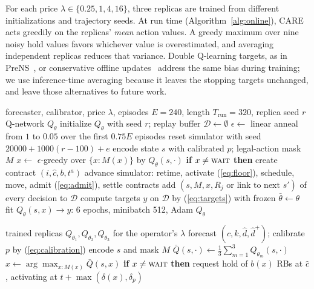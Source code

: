 \documentclass[conference]{IEEEtran}
\begin{document}
For each price $\lambda\in\{0.25,1,4,16\}$, three replicas are trained from different initializations and trajectory seeds. At run time (Algorithm~\ref{alg:online}), CARE acts greedily on the replicas' \emph{mean} action values. A greedy maximum over nine noisy hold values favors whichever value is overestimated, and averaging independent replicas reduces that variance. Double Q-learning targets, as in PreNS~\cite{wu2026prens}, or conservative offline updates~\cite{eldeeb2025offline} address the same bias during training; we use inference-time averaging because it leaves the stopping targets unchanged, and leave those alternatives to future work.

\begin{algorithm}[t]
\caption{CARE training at price $\lambda$ (one replica)}
\label{alg:train}
\begin{algorithmic}[1]
\REQUIRE forecaster, calibrator, price $\lambda$, episodes $E=240$, length $T_{\mathrm{run}}=320$, replica seed $r$
\ENSURE Q-network $Q_\theta$
\STATE initialize $Q_\theta$ with seed $r$; replay buffer $\mathcal{D}\leftarrow\emptyset$
  \STATE $\epsilon\leftarrow$ linear anneal from $1$ to $0.05$ over the first $0.75E$ episodes
  \STATE reset simulator with seed $20000+1000(r-100)+e$
      \STATE encode state $s$ with calibrated $p$; legal-action mask $M$
      \STATE $x\leftarrow$ $\epsilon$-greedy over $\{x:M(x)\}$ by $Q_\theta(s,\cdot)$
      \STATE \textbf{if} $x\ne\textsc{wait}$ \textbf{then} create contract $(i,\hat{c},b,t^{a})$
    \ENDFOR
    \STATE advance simulator: retime, activate (\ref{eq:floor}), schedule, move, admit (\ref{eq:admit}), settle contracts
  \ENDFOR
  \STATE add $(s,M,x,R_j\text{ or link to next }s')$ of every decision to $\mathcal{D}$
      \STATE compute targets $y$ on $\mathcal{D}$ by (\ref{eq:targets}) with frozen $\bar\theta\leftarrow\theta$
      \STATE fit $Q_\theta(s,x)\to y$: 6 epochs, minibatch 512, Adam
    \ENDFOR
  \ENDIF
\ENDFOR
\RETURN $Q_\theta$
\end{algorithmic}
\end{algorithm}

\begin{algorithm}[t]
\caption{CARE online decision in one interval}
\label{alg:online}
\begin{algorithmic}[1]
\REQUIRE trained replicas $Q_{\theta_1},Q_{\theta_2},Q_{\theta_3}$ for the operator's $\lambda$
  \STATE forecast $(\hat c,k,\hat d,\hat d^{+})$; calibrate $p$ by (\ref{eq:calibration})
  \STATE encode $s$ and mask $M$
  \STATE $\bar Q(s,\cdot)\leftarrow\frac13\sum_{m=1}^{3}Q_{\theta_m}(s,\cdot)$
  \STATE $x\leftarrow\arg\max_{x:M(x)}\bar Q(s,x)$
  \STATE \textbf{if} $x\ne\textsc{wait}$ \textbf{then} request hold of $b(x)$ RBs at $\hat c$, activating at $t+\max(\delta(x),\delta_p)$
\ENDFOR
\end{algorithmic}
\end{algorithm}
\end{document}
